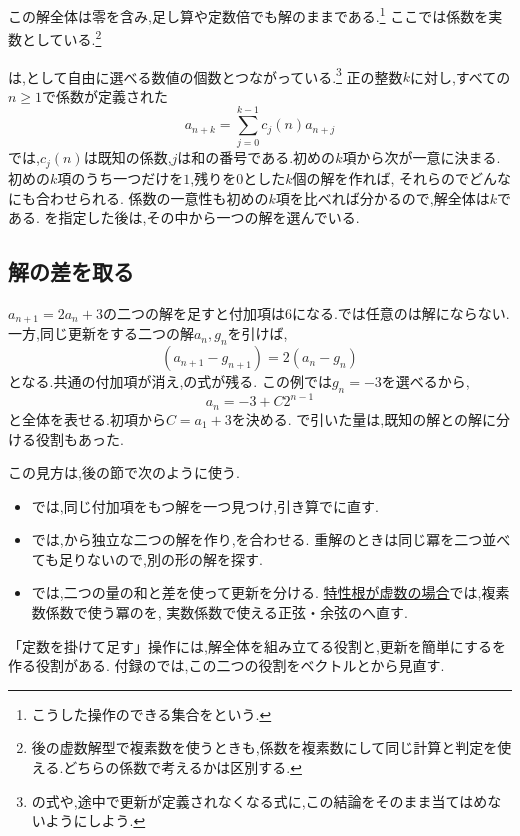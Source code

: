 この解全体は零を含み,足し算や定数倍でも解のままである.\footnote{こうした操作のできる集合を\textbf{}という.}
ここでは係数を実数としている.\footnote{後の虚数解型で複素数を使うときも,係数を複素数にして同じ計算と判定を使える.どちらの係数で考えるかは区別する.}

は,として自由に選べる数値の個数とつながっている.\footnote{の式や,途中で更新が定義されなくなる式に,この結論をそのまま当てはめないようにしよう.}
正の整数$k$に対し,すべての$n\ge1$で係数が定義された
\[
  a_{n+k}=\sum_{j=0}^{k-1}c_j(n)a_{n+j}
\]
では,$c_j(n)$は既知の係数,$j$は和の番号である.初めの$k$項から次が一意に決まる.
初めの$k$項のうち一つだけを$1$,残りを$0$とした$k$個の解を作れば,
それらのでどんなにも合わせられる.
係数の一意性も初めの$k$項を比べれば分かるので,解全体は$k$である.
を指定した後は,その中から一つの解を選んでいる.

\subsection{解の差を取る}\label{節：解の差を取る}
$a_{n+1}=2a_n+3$の二つの解を足すと付加項は$6$になる.では任意のは解にならない.
一方,同じ更新をする二つの解$a_n,g_n$を引けば,
\[
  (a_{n+1}-g_{n+1})=2(a_n-g_n)
\]
となる.共通の付加項が消え,の式が残る.
この例では$g_n=-3$を選べるから,
\[
  a_n=-3+C2^{n-1}
\]
と全体を表せる.初項から$C=a_1+3$を決める.
で引いた量は,既知の解との解に分ける役割もあった.

この見方は,後の節で次のように使う.
\begin{itemize}
  \item {}では,同じ付加項をもつ解を一つ見つけ,引き算でに直す.
  \item {}では,から独立な二つの解を作り,を合わせる.
    重解のときは同じ冪を二つ並べても足りないので,別の形の解を探す.
  \item {}では,二つの量の和と差を使って更新を分ける.
    \hyperref[節：特性根が虚数の場合]{特性根が虚数の場合}では,複素数係数で使う冪のを,
    実数係数で使える正弦・余弦のへ直す.
\end{itemize}
「定数を掛けて足す」操作には,解全体を組み立てる役割と,更新を簡単にするを作る役割がある.
付録のでは,この二つの役割をベクトルとから見直す.
